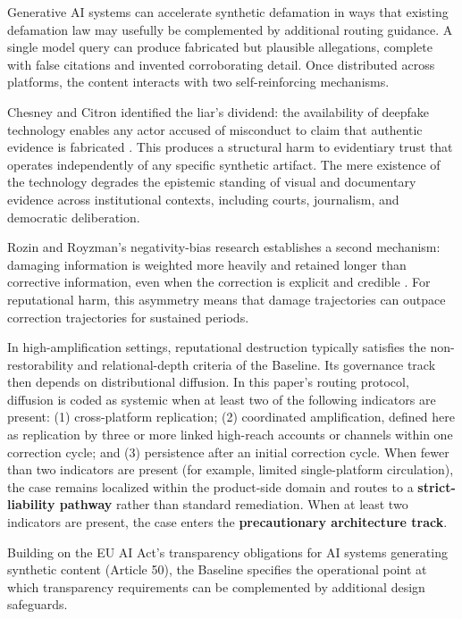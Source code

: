 \documentclass[11pt]{article}
\begin{document}
Generative AI systems can accelerate synthetic defamation in ways that existing defamation law may usefully be complemented by additional routing guidance. A single model query can produce fabricated but plausible allegations, complete with false citations and invented corroborating detail. Once distributed across platforms, the content interacts with two self-reinforcing mechanisms.

Chesney and Citron identified the liar's dividend: the availability of deepfake technology enables any actor accused of misconduct to claim that authentic evidence is fabricated \parencite{chesney2019}. This produces a structural harm to evidentiary trust that operates independently of any specific synthetic artifact. The mere existence of the technology degrades the epistemic standing of visual and documentary evidence across institutional contexts, including courts, journalism, and democratic deliberation.

Rozin and Royzman's negativity-bias research establishes a second mechanism: damaging information is weighted more heavily and retained longer than corrective information, even when the correction is explicit and credible \parencite{rozin2001}. For reputational harm, this asymmetry means that damage trajectories can outpace correction trajectories for sustained periods.

In high-amplification settings, reputational destruction typically satisfies the non-restorability and relational-depth criteria of the Baseline. Its governance track then depends on distributional diffusion. In this paper's routing protocol, diffusion is coded as systemic when at least two of the following indicators are present: (1) cross-platform replication; (2) coordinated amplification, defined here as replication by three or more linked high-reach accounts or channels within one correction cycle; and (3) persistence after an initial correction cycle. When fewer than two indicators are present (for example, limited single-platform circulation), the case remains localized within the product-side domain and routes to a \textbf{strict-liability pathway} rather than standard remediation. When at least two indicators are present, the case enters the \textbf{precautionary architecture track}.

Building on the EU AI Act's transparency obligations for AI systems generating synthetic content (Article 50), the Baseline specifies the operational point at which transparency requirements can be complemented by additional design safeguards.
\end{document}
